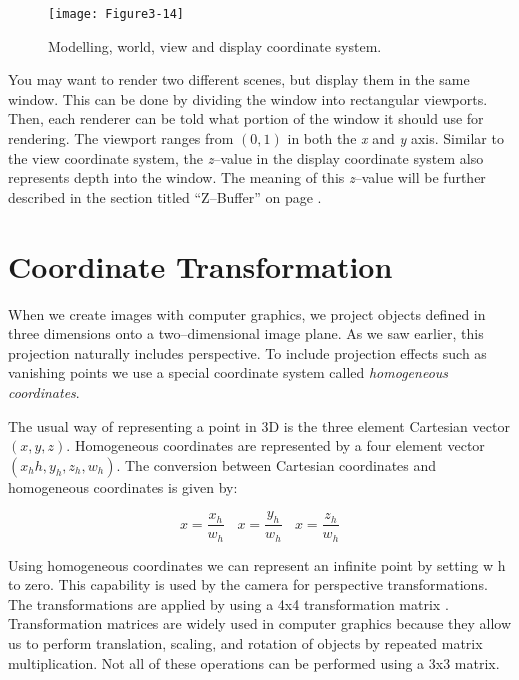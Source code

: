 \begin{figure}[!htb]
  \centering
  \texttt{[image: Figure3-14]}\\
  \caption{ Modelling, world, view and display coordinate system.}\label{fig:Figure3-14}
\end{figure}

You may want to render two different scenes, but display them in the same window. This can be done by dividing the window into rectangular viewports. Then, each renderer can be told what portion of the window it should use for rendering. The viewport ranges from $(0,1)$ in both the \emph{x} and \emph{y} axis. Similar to the view coordinate system, the \emph{z}--value in the display coordinate system also represents depth into the window. The meaning of this \emph{z}--value will be further described in the section titled ``Z--Buffer'' on page \pageref{Z--Buffer}.


\section{Coordinate Transformation}

When we create images with computer graphics, we project objects defined in three dimensions onto a two--dimensional image plane. As we saw earlier, this projection naturally includes perspective. To include projection effects such as vanishing points we use a special coordinate system called \emph{homogeneous coordinates}.

The usual way of representing a point in 3D is the three element Cartesian vector $(x, y, z)$. Homogeneous coordinates are represented by a four element vector $( x_hh, y_h, z_h, w_h )$. The conversion between Cartesian coordinates and homogeneous coordinates is given by:

\begin{equation}\label{eq:3.5}
x = \frac{x_h}{w_h}\ \ \ \  x = \frac{y_h}{w_h}\ \ \ \ x = \frac{z_h}{w_h}
\end{equation}

Using homogeneous coordinates we can represent an infinite point by setting w h to zero. This capability is used by the camera for perspective transformations. The transformations are applied by using a 4x4 transformation matrix . Transformation matrices are widely used in computer graphics because they allow us to perform translation, scaling, and rotation of objects by repeated matrix multiplication. Not all of these operations can be performed using a 3x3 matrix.

